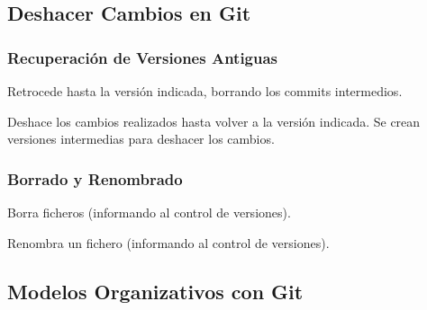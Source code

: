 \documentclass[handout,a4paper,slidestop,dvips,xcolor=pst,blue]{beamer}
\begin{document}
\begin{frame}[t]
\end{frame}

\subsection{Deshacer Cambios en Git}

\begin{frame}[c]
	\frametitle{Recuperación de Versiones Antiguas}
	 \begin{description}[<+->]
        \item[reset] Retrocede hasta la versión indicada, borrando los commits intermedios.
        \item[revert] Deshace los cambios realizados hasta volver a la versión indicada. Se crean versiones intermedias para deshacer los cambios.
	 \end{description}
\end{frame}

\begin{frame}[c]
	\frametitle{Borrado y Renombrado}
	 \begin{description}[<+->]
        \item[rm] Borra ficheros (informando al control de versiones).
        \item[mv] Renombra un fichero (informando al control de versiones).
	 \end{description}
\end{frame}

\subsection{Modelos Organizativos con Git}
\end{document}
